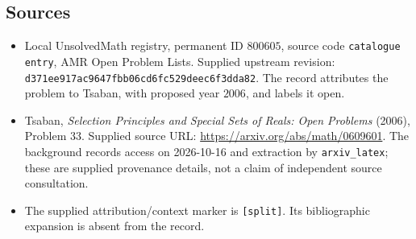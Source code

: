 \documentclass[11pt]{article}
\begin{document}
\subsection{Sources}
\begin{itemize}
\item Local UnsolvedMath registry, permanent ID \(800605\), source code \texttt{catalogue entry}, AMR Open Problem Lists. Supplied upstream revision: \texttt{d371ee917ac9647fbb06cd6fc529deec6f3dda82}. The record attributes the problem to Tsaban, with proposed year \(2006\), and labels it open.
\item Tsaban, \emph{Selection Principles and Special Sets of Reals: Open Problems} (2006), Problem 33. Supplied source URL: \url{https://arxiv.org/abs/math/0609601}. The background records access on 2026-10-16 and extraction by \texttt{arxiv\_latex}; these are supplied provenance details, not a claim of independent source consultation.
\item The supplied attribution/context marker is \texttt{[split]}. Its bibliographic expansion is absent from the record.
\end{itemize}
\end{document}
